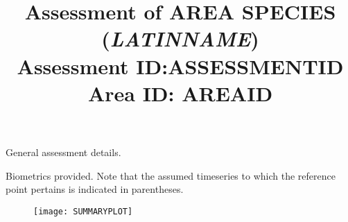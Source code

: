 \documentclass[a4paper,10pt]{article}
\title{Assessment of AREA SPECIES (\textit{LATINNAME})\\{\large Assessment ID:ASSESSMENTID \\Area ID: AREAID}}
\date{}
\begin{document}
\maketitle
\thispagestyle{empty}
\vspace*{-.75in}
\begin{center}
{\large General assessment details.}
\end{center}

\begin{center}
{\large Biometrics provided. Note that the assumed timeseries to which the reference point pertains is indicated in parentheses.}
\begin{table}[htb]
\centering


\end{table}
\end{center}
%
\pagebreak
\vspace*{1cm}

\begin{figure}[htbp] %
   \centering
   \texttt{[image: SUMMARYPLOT]} 
\end{figure}
\end{document}
